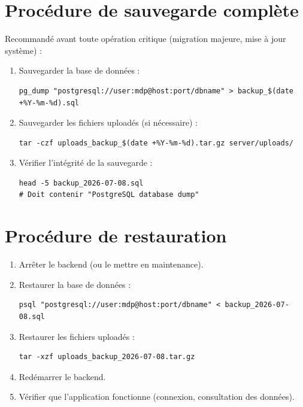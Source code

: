 \documentclass[12pt,a4paper]{report}
\begin{document}
\section{Procédure de sauvegarde complète}

Recommandé avant toute opération critique (migration majeure, mise à jour système) :

\begin{enumerate}
    \item Sauvegarder la base de données :
\begin{lstlisting}
pg_dump "postgresql://user:mdp@host:port/dbname" > backup_$(date +%Y-%m-%d).sql
\end{lstlisting}
    \item Sauvegarder les fichiers uploadés (si nécessaire) :
\begin{lstlisting}
tar -czf uploads_backup_$(date +%Y-%m-%d).tar.gz server/uploads/
\end{lstlisting}
    \item Vérifier l'intégrité de la sauvegarde :
\begin{lstlisting}
head -5 backup_2026-07-08.sql
# Doit contenir "PostgreSQL database dump"
\end{lstlisting}
\end{enumerate}

\section{Procédure de restauration}

\begin{enumerate}
    \item Arrêter le backend (ou le mettre en maintenance).
    \item Restaurer la base de données :
\begin{lstlisting}
psql "postgresql://user:mdp@host:port/dbname" < backup_2026-07-08.sql
\end{lstlisting}
    \item Restaurer les fichiers uploadés :
\begin{lstlisting}
tar -xzf uploads_backup_2026-07-08.tar.gz
\end{lstlisting}
    \item Redémarrer le backend.
    \item Vérifier que l'application fonctionne (connexion, consultation des données).
\end{enumerate}

\end{document}
